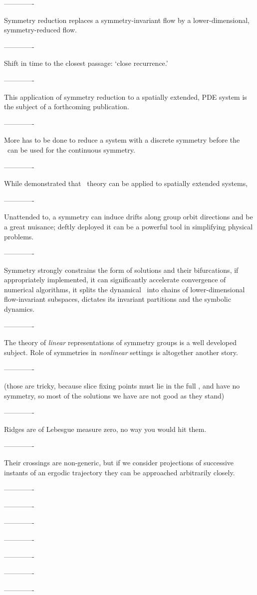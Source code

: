 -------------

Symmetry reduction replaces a symmetry-invariant flow by a
lower-dimensional, symmetry-reduced flow.

-------------

Shift in time to the closest passage:
`close recurrence.'

-------------

This application of symmetry reduction to a spatially extended, PDE
system is the subject of a forthcoming publication.

-------------

More has to be done to reduce a system with a discrete
symmetry before the \mslices\ can be used for the continuous symmetry.

-------------

While  demonstrated that \po\ theory can be
applied to spatially extended systems,

-------------

Unattended to, a symmetry can induce drifts along group orbit directions
and be a great nuisance; deftly deployed it can be a powerful tool in
simplifying physical problems.

-------------

Symmetry strongly constrains the form of solutions and their
bifurcations, if appropriately implemented, it can significantly
accelerate convergence of numerical algorithms, it splits the dynamical
\statesp\ into chains of lower-dimensional flow-invariant subspaces,
dictates its invariant partitions and the symbolic dynamics.

-------------

The theory of \emph{linear} representations of symmetry groups is a well
developed subject. Role of symmetries in \emph{nonlinear} settings is
altogether another story.

-------------

(those are tricky, because slice fixing points must lie in the full
\statesp, and have no symmetry, so most of the solutions we have are not
good as they stand)

-------------

Ridges are of Lebesgue measure zero, no way you would hit them.

-------------

Their crossings are non-generic, but if we consider projections of
successive instants of an ergodic trajectory they can be approached
arbitrarily closely.

-------------

-------------

-------------

-------------

-------------

-------------

-------------
